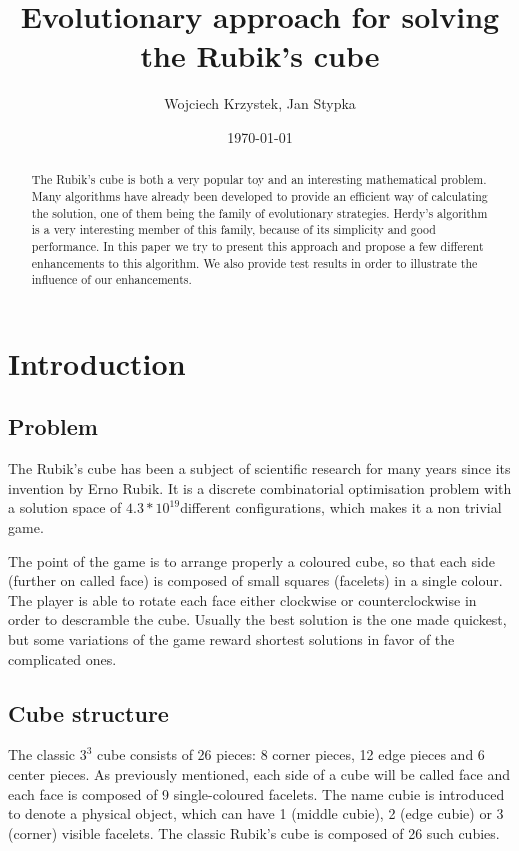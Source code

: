 \documentclass[a4paper]{article}
\title{Evolutionary approach for solving the Rubik’s cube}
\author{Wojciech Krzystek, Jan Stypka}
\date{\today}
\begin{document}
\maketitle

\begin{abstract}
The Rubik's cube is both a very popular toy and an interesting mathematical problem. Many algorithms have already been developed to provide an efficient way of calculating the solution, one of them being the family of evolutionary strategies. Herdy's algorithm is a very interesting member of this family, because of its simplicity and good performance. In this paper we try to present this approach and propose a few different enhancements to this algorithm. We also provide test results in order to illustrate the influence of our enhancements.
\end{abstract}

\section{Introduction}
\subsection{Problem}

The Rubik’s cube has been a subject of scientific research for many years since its invention by Erno Rubik. It is a discrete combinatorial optimisation problem with a solution space of \(4.3*10^{19}\)different configurations, which makes it a non trivial game.

The point of the game is to arrange properly a coloured cube, so that each side (further on called face) is composed of small squares (facelets) in a single colour. The player is able to rotate each face either clockwise or counterclockwise in order to descramble the cube.
Usually the best solution is the one made quickest, but some variations of the game reward shortest solutions in favor of the complicated ones.

\subsection{Cube structure}
The classic \(3^3\) cube consists of  26 pieces: 8 corner pieces, 12 edge pieces and 6 center pieces. As previously mentioned, each side of a cube will be called face and each face is composed of 9 single-coloured facelets. The name cubie is introduced to denote a physical object, which can have 1 (middle cubie), 2 (edge cubie) or 3 (corner) visible facelets. The classic Rubik’s cube is composed of 26 such cubies.
\end{document}
